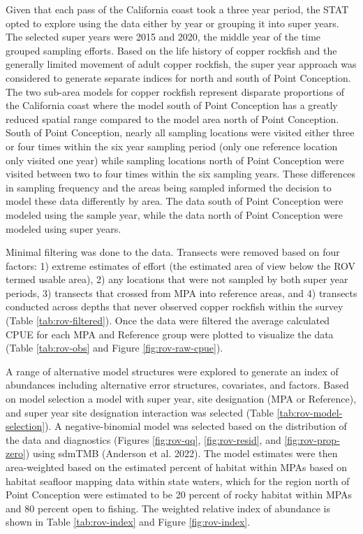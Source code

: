 \documentclass[11pt,
  english,
  letterpaper,
]{article}
\begin{document}
Given that each pass of the California coast took a three year period, the STAT opted to explore using the data either by year or grouping it into super years. The selected super years were 2015 and 2020, the middle year of the time grouped sampling efforts. Based on the life history of copper rockfish and the generally limited movement of adult copper rockfish, the super year approach was considered to generate separate indices for north and south of Point Conception. The two sub-area models for copper rockfish represent disparate proportions of the California coast where the model south of Point Conception has a greatly reduced spatial range compared to the model area north of Point Conception. South of Point Conception, nearly all sampling locations were visited either three or four times within the six year sampling period (only one reference location only visited one year) while sampling locations north of Point Conception were visited between two to four times within the six sampling years. These differences in sampling frequency and the areas being sampled informed the decision to model these data differently by area. The data south of Point Conception were modeled using the sample year, while the data north of Point Conception were modeled using super years.

Minimal filtering was done to the data. Transects were removed based on four factors: 1) extreme estimates of effort (the estimated area of view below the ROV termed usable area), 2) any locations that were not sampled by both super year periods, 3) transects that crossed from MPA into reference areas, and 4) transects conducted across depths that never observed copper rockfish within the survey (Table \ref{tab:rov-filtered}). Once the data were filtered the average calculated CPUE for each MPA and Reference group were plotted to visualize the data (Table \ref{tab:rov-obs} and Figure \ref{fig:rov-raw-cpue}).

A range of alternative model structures were explored to generate an index of abundances including alternative error structures, covariates, and factors. Based on model selection a model with super year, site designation (MPA or Reference), and super year site designation interaction was selected (Table \ref{tab:rov-model-selection}). A negative-binomial model was selected based on the distribution of the data and diagnostics (Figures \ref{fig:rov-qq}, \ref{fig:rov-resid}, and \ref{fig:rov-prop-zero}) using sdmTMB (Anderson et al. 2022). The model estimates were then area-weighted based on the estimated percent of habitat within MPAs based on habitat seafloor mapping data within state waters, which for the region north of Point Conception were estimated to be 20 percent of rocky habitat within MPAs and 80 percent open to fishing. The weighted relative index of abundance is shown in Table \ref{tab:rov-index} and Figure \ref{fig:rov-index}.
\end{document}
